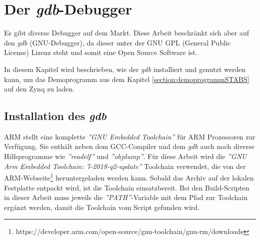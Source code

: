 \chapter{Der \textit{gdb}-Debugger}
\label{chapter:Der-gdb-Debugger}
Es gibt diverse Debugger auf dem Markt.
Diese Arbeit beschränkt sich aber auf den  \textit{gdb} (GNU-Debugger), da dieser unter der GNU GPL (General Public License) Lizenz steht und somit eine Open Source Software ist.

In diesem Kapitel wird beschrieben, wie der \textit{gdb} installiert und genutzt werden kann, um das Demoprogramm aus dem Kapitel \ref{section:demoprogrammSTABS} auf den Zynq zu laden.


\section{Installation des \textit{gdb}}
ARM stellt eine komplette \textit{''GNU Embedded Toolchain''} für ARM Prozessoren zur Verfügung.
Sie enthält neben dem GCC-Compiler und dem \textit{gdb} auch noch diverse Hilfsprogramme wie \textit{''readelf''} und \textit{''objdump''}.
Für diese Arbeit wird die \textit{''GNU Arm Embedded Toolchain: 7-2018-q2-update''} Toolchain verwendet, die von der ARM-Webseite\footnote{https://developer.arm.com/open-source/gnu-toolchain/gnu-rm/downloads} heruntergeladen werden kann.
Sobald das Archiv auf der lokalen Festplatte entpackt wird, ist die Toolchain einsatzbereit.
Bei den Build-Scripten in dieser Arbeit muss jeweils die \textit{''PATH''}-Variable mit dem Pfad zur Toolchain ergänzt werden, damit die Toolchain vom Script gefunden wird.


